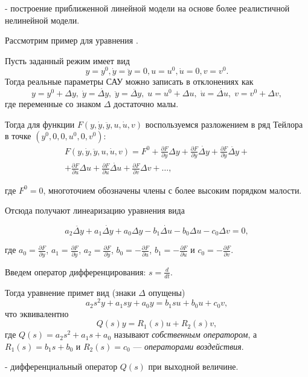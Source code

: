 \documentclass[TAU.tex]{subfiles}
\begin{document}
 - построение приближенной линейной модели на основе более реалистичной нелинейной модели.

Рассмотрим пример для уравнения .

Пусть заданный режим имеет вид
$$
y = y^0, \dot y = \ddot y = 0, u=u^0, \dot u = 0, v=v^0.
$$
Тогда реальные параметры САУ можно записать в отклонениях как
$$
y = y^0+\Delta y,\;\dot y = \dot{\Delta y},\;\ddot y = \ddot{\Delta y},\; u = u^0 + \Delta u,\; \dot u = \dot{\Delta u},\;v = v^0 + \Delta v,
$$
где переменные со знаком $\Delta$ достаточно малы.

Тогда для функции $F(y,\dot y, \ddot y, u, \dot u, v)$ воспользуемся разложением в ряд Тейлора в точке $(y^0, 0,0, u^0, 0, v^0)$:
\begin{multline}
F(y,\dot y, \ddot y, u, \dot u, v) = F^0 + \frac{\partial F}{\partial y} \Delta y +\frac{\partial F}{\partial \dot y} \dot{\Delta y}+ \frac{\partial F}{\partial \ddot y} \ddot{\Delta y} +\\  + \frac{\partial F}{\partial u} \Delta u + \frac{\partial F}{\partial \dot u } \dot{\Delta u} + \frac{\partial F}{\partial v} \Delta v + \ldots,
\end{multline}

где $F^0= 0$, многоточием обозначены члены с более высоким порядком малости.

Отсюда получают линеаризацию уравнения  вида

\begin{equation}\label{EQ_LINEAR}
a_2\ddot{\Delta y} + a_1 \dot{\Delta y} + a_0 \Delta y - b_1\dot{\Delta u} - b_0\Delta u - c_0 \Delta v = 0,
\end{equation}

где $a_0 = \frac{\partial F}{\partial y}$, $a_1 = \frac{\partial F}{\partial \dot y}$, $a_2 = \frac{\partial F}{\partial \ddot y}$, $b_0 = -\frac{\partial F}{\partial u}$, $b_1 = -\frac{\partial F}{\partial \dot u }$ и $c_0 = -\frac{\partial F}{\partial v}$.

Введем оператор дифференцирования: $s = \frac{d}{dt}$.

Тогда уравнение  примет вид (знаки $\Delta$ опущены)
$$
a_2 s^2 y + a_1 s y + a_0 y = b_1 s u + b_0 u + c_0 v,
$$
что эквивалентно
$$
Q(s) y = R_1(s)u + R_2(s)v,
$$
где $Q(s) = a_2s^2 + a_1 s + a_0$ называют {\it собственным оператором}, а $R_1(s) = b_1s+b_0$ и $R_2(s) = c_0$ --- {\it операторами воздействия}.

 - дифференциальный оператор $Q(s)$ при выходной величине.
\end{document}
